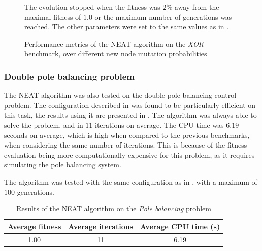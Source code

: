 \begin{figure}
\begin{center}
    \end{center}
    \caption{Performance metrics of the NEAT algorithm on the \textit{XOR} benchmark, over different new node mutation probabilities}
    {The evolution stopped when the fitness was $2\%$ away from the maximal fitness of $1.0$ or the maximum number of generations was reached.
    The other parameters were set to the same values as in \cite{neat}.}
    \label{fig:neat_xor_probabilities}
\end{figure}

\subsubsection{Double pole balancing problem}

The NEAT algorithm was also tested on the double pole balancing control problem.
The configuration described in \cite{neat} was found to be particularly efficient on this task, the results using it are presented in .
The algorithm was always able to solve the problem, and in $11$ iterations on average. The CPU time was $6.19$ seconds on average, which is high when compared to the previous benchmarks,
when considering the same number of iterations. This is because of the fitness evaluation being more computationally expensive for this problem, as it requires simulating the pole balancing
system.

\begin{table}
    \caption{Results of the NEAT algorithm on the \textit{Pole balancing} problem}{The algorithm was tested with the same configuration as in \cite{neat}, with a maximum of $100$ generations.}
    \centering
    \label{tab:nneat_pole}
    \begin{tabular}{ |c|c|c| }
        \hline
        Average fitness & Average iterations & Average CPU time (s) \\
        \hline
        1.00 & 11 & 6.19 \\
        \hline\hline
    \end{tabular}
\end{table}

